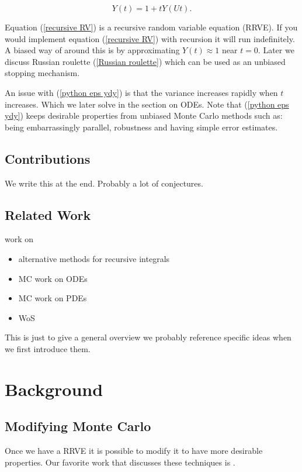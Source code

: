 \documentclass[a4paper,12pt]{article}
\begin{document}
\begin{equation}\label{recursive RV}
    Y(t) = 1 + tY(Ut).
\end{equation}

Equation (\ref{recursive RV}) is a recursive random variable equation (RRVE). If you would implement equation
(\ref{recursive RV}) with recursion it will run indefinitely. A biased way of around this is by approximating
$Y(t) \approx 1$ near $t = 0$. Later we discuss Russian roulette (\ref{Russian roulette}) which
can be used as an unbiased stopping mechanism.

\vspace*{0.2cm}

\begin{pythonn} \label{python eps ydy}
\end{pythonn}

An issue with (\ref{python eps ydy}) is that the variance increases rapidly when $t$ increases. Which we
later solve in the section on ODEs. Note that (\ref{python eps ydy}) keeps desirable properties
from unbiased Monte Carlo methods such as: being embarrassingly parallel,
robustness and having simple error estimates.


\subsection{Contributions}
We write this at the end. Probably a lot of conjectures.

\subsection{Related Work}
work on
\begin{itemize}
    \item alternative methods for recursive integrals
    \item MC work on ODEs
    \item MC work on PDEs
    \item WoS
\end{itemize}
This is just to give a general overview we probably reference specific ideas when we first introduce them.

\section{Background}
\subsection{Modifying Monte Carlo}
Once we have a RRVE it is possible to modify it
to have more desirable properties.
Our favorite work that discusses these techniques is \cite{veach_robust_nodate}.
\end{document}
